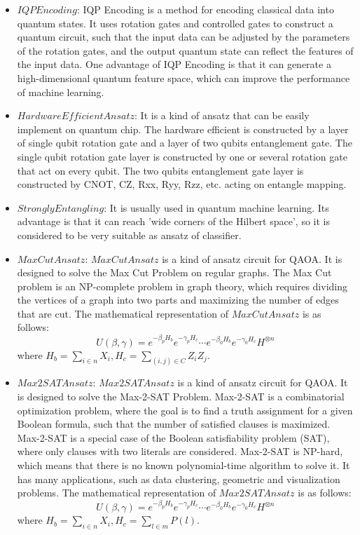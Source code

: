 \begin{itemize}
    \item $IQPEncoding$: IQP Encoding is a method for encoding classical data into quantum states\cite{Havlíček2019}. It uses rotation gates and controlled gates to construct a quantum circuit, such that the input data can be adjusted by the parameters of the rotation gates, and the output quantum state can reflect the features of the input data. One advantage of IQP Encoding is that it can generate a high-dimensional quantum feature space, which can improve the performance of machine learning.

    \item $HardwareEfficientAnsatz$: It is a kind of ansatz that can be easily implement on quantum chip\cite{Kandala2017}. The hardware efficient is constructed by a layer of single qubit rotation gate and a layer of two qubits entanglement gate. The single qubit rotation gate layer is constructed by one or several rotation gate that act on every qubit. The two qubits entanglement gate layer is constructed by CNOT, CZ, Rxx, Ryy, Rzz, etc. acting on entangle mapping.

    \item $StronglyEntangling$: It is usually used in quantum machine learning. Its advantage is that it can reach 'wide corners of the Hilbert space'\cite{Schuld_2020}, so it is considered to be very suitable as ansatz of classifier.

    \item $MaxCutAnsatz$: $MaxCutAnsatz$ is a kind of ansatz circuit for QAOA\cite{farhi2014quantum}. It is designed to solve the Max Cut Problem on regular graphs. The Max Cut problem is an NP-complete problem in graph theory, which requires dividing the vertices of a graph into two parts and maximizing the number of edges that are cut. The mathematical representation of $MaxCutAnsatz$ is as follows:
    $$U(\beta, \gamma) = e^{-\beta_pH_b}e^{-\gamma_pH_c}
    \cdots e^{-\beta_0H_b}e^{-\gamma_0H_c}H^{\otimes n}$$
    where $H_b = \sum_{i\in n}X_{i}, H_c = \sum_{(i,j)\in C}Z_iZ_j$.

    \item $Max2SATAnsatz$: $Max2SATAnsatz$ is a kind of ansatz circuit for QAOA\cite{Akshay_2020}. It is designed to solve the Max-2-SAT Problem. Max-2-SAT is a combinatorial optimization problem, where the goal is to find a truth assignment for a given Boolean formula, such that the number of satisfied clauses is maximized. Max-2-SAT is a special case of the Boolean satisfiability problem (SAT), where only clauses with two literals are considered. Max-2-SAT is NP-hard, which means that there is no known polynomial-time algorithm to solve it. It has many applications, such as data clustering, geometric and visualization problems. The mathematical representation of $Max2SATAnsatz$ is as follows:
    $$U(\beta, \gamma) = e^{-\beta_pH_b}e^{-\gamma_pH_c}
    \cdots e^{-\beta_0H_b}e^{-\gamma_0H_c}H^{\otimes n}$$
    where $H_b = \sum_{i\in n}X_{i}, H_c = \sum_{l\in m}P(l)$.


\end{itemize}
